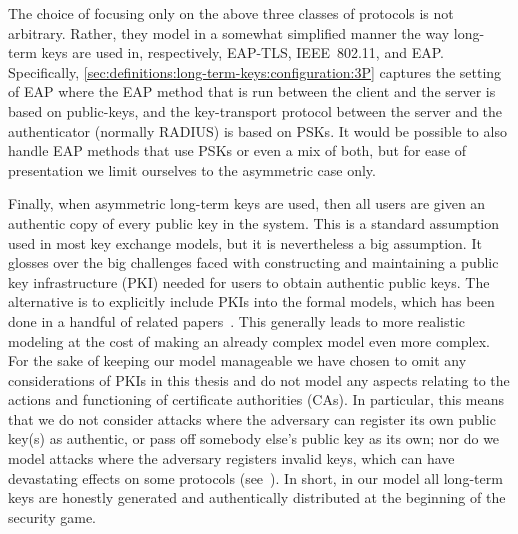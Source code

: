 The choice of focusing only on the above three classes of protocols is not arbitrary.
Rather,
they model in a somewhat simplified manner the way  long-term keys are used in,
respectively,
EAP-TLS, 
IEEE~802.11,
and EAP.
Specifically,
\cref{sec:definitions:long-term-keys:configuration:3P} captures the setting of EAP where the EAP method that is run between the client and the server is based on public-keys,
and the key-transport protocol between the server and the authenticator (normally RADIUS) is based on PSKs.
It would be possible to also handle EAP methods that use PSKs or even a mix of both,
but for ease of presentation we limit ourselves to the asymmetric case only.

Finally,
when asymmetric long-term keys are used,
then all users are given an authentic copy of every public key in the system.
This is a standard assumption used in most key exchange models,
but it is nevertheless a big assumption. 
It glosses over the big challenges faced with constructing and maintaining a public key infrastructure (PKI) needed for users to obtain authentic public keys.
The alternative is to explicitly include PKIs into the formal models,
which has been done in a handful of related papers~\cite{PKC:BFPW07,AFRICACRYPT:FarWar09,ESORICS:BCFPPS13}.
This generally leads to more realistic modeling at the cost of making an already complex model even more complex.
For the sake of keeping our model manageable we have chosen to omit any considerations of PKIs in this thesis
and do not model any aspects relating to the actions and functioning of certificate authorities (CAs).
In particular,
this means that we do not consider attacks where the adversary can register its own public key(s) as authentic,
or pass off somebody else's public key as its own;
nor do we model attacks where the adversary registers invalid keys,
which can have devastating effects on some protocols (see~\cite{INDOCRYPT:MenUst06}).
In short,
in our model all long-term keys are honestly generated and authentically distributed at the beginning of the security game. 



